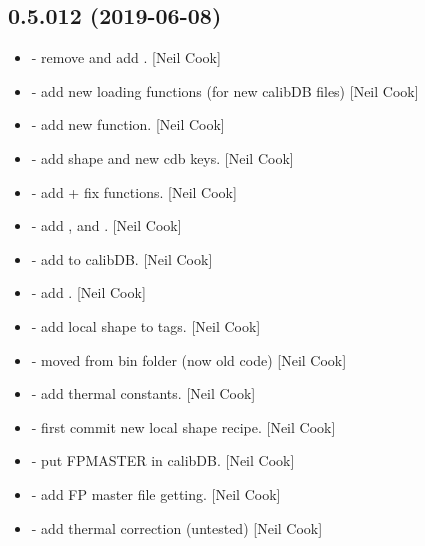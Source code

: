 \documentclass[a4paper,10pt,english]{report}
\begin{document}
\subsection{0.5.012 (2019-06-08)}
\label{\detokenize{misc/changelog:id124}}\begin{itemize}
\item {} 
 - remove  and add
. {[}Neil Cook{]}

\item {} 
 - add new loading functions (for new calibDB files)
{[}Neil Cook{]}

\item {} 
 - add new  function. {[}Neil
Cook{]}

\item {} 
 - add shape and new cdb keys. {[}Neil Cook{]}

\item {} 
 - add  + fix  functions.
{[}Neil Cook{]}

\item {} 
 - add ,  and
. {[}Neil Cook{]}

\item {} 
 - add  to calibDB. {[}Neil Cook{]}

\item {} 
 - add . {[}Neil Cook{]}

\item {} 
 - add local shape to tags. {[}Neil Cook{]}

\item {} 
 - moved from bin folder (now old code) {[}Neil Cook{]}

\item {} 
 - add thermal constants. {[}Neil Cook{]}

\item {} 
 - first commit new local shape recipe. {[}Neil Cook{]}

\item {} 
 - put FPMASTER in calibDB. {[}Neil Cook{]}

\item {} 
 - add FP master file getting. {[}Neil Cook{]}

\item {} 
 - add thermal correction (untested) {[}Neil
Cook{]}

\end{itemize}
\end{document}

